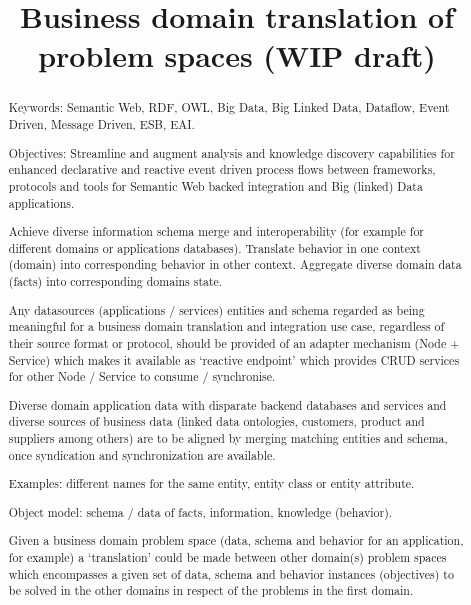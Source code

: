 \documentclass[runningheads,a4paper]{llncs}
\begin{document}
\mainmatter

\title{Business domain translation of problem spaces (WIP draft)}
\author{}

\institute{\\
\email{}}
\maketitle

\begin{abstract}
Keywords: Semantic Web, RDF, OWL, Big Data, Big Linked Data, Dataflow, Event Driven, Message Driven, ESB, EAI.

Objectives: Streamline and augment analysis and knowledge discovery capabilities for enhanced declarative and reactive event driven process flows between frameworks, protocols and tools for Semantic Web backed integration and Big (linked) Data applications.

Achieve diverse information schema merge and interoperability (for example for different domains or applications databases). Translate behavior in one context (domain) into corresponding behavior in other context. Aggregate diverse domain data (facts) into corresponding domains state.

Any datasources (applications / services) entities and schema regarded as being meaningful for a business domain translation and integration use case, regardless of their source format or protocol, should be provided of an adapter mechanism (Node + Service) which makes it available as `reactive endpoint' which provides CRUD services for other Node / Service to consume / synchronise.

Diverse domain application data with disparate backend databases and services and diverse sources of business data (linked data ontologies, customers, product and suppliers among others) are to be aligned by merging matching entities and schema, once syndication and synchronization are available.

Examples: different names for the same entity, entity class or entity attribute.

Object model: schema / data of facts, information, knowledge (behavior).

Given a business domain problem space (data, schema and behavior for an application, for example) a `translation' could be made between other domain(s) problem spaces which encompasses a given set of data, schema and behavior instances (objectives) to be solved in the other domains in respect of the problems in the first domain.


\end{abstract}
\end{document}
